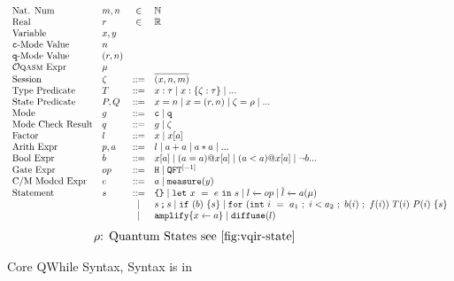 \begin{figure}[t]
{
  \small
  \[\begin{array}{llcl} 
      \text{Nat. Num} & m, n & \in & \mathbb{N}       \\
      \text{Real} & r & \in & \mathbb{R}\\
      \text{Variable} & x,y \\
      \text{\cmode-Mode Value} & n\\
      \text{\mmode-Mode Value} & (r,n)\\
      \text{\oqasm Expr} & \mu\\
      \text{Session} & \zeta & ::= & \overline{(x,n,m)} \\
      \text{Type Predicate} & T & ::= & x:\tau  \mid x:\{\zeta:\tau\} \mid ...\\
      \text{State Predicate} & P,Q & ::= & x=n\mid x=(r,n)  \mid \zeta=\rho \mid ...\\
      \text{Mode} & g & ::= & \cmode  \mid \mmode\\
      \text{Mode Check Result} & q & ::= & g  \mid \zeta\\
      \text{Factor} & l & ::= & x \mid x[a] \\
      \text{Arith Expr} & p,a & ::= & l \mid a + a \mid a * a \mid ... \\
      \text{Bool Expr} & b & ::= & x[a] \mid (a = a) @ x[a] \mid (a < a) @ x[a] \mid \neg b  ... \\
      \text{Gate Expr} & op & ::= & \texttt{H} \mid \iqft[\lbrack -1 \rbrack]{}{} \\
      \text{C/M Moded Expr}& e & ::= & a \mid \smea{y}  \\
      \text{Statement} & s & ::= & \sskip \mid \sexp{x}{e}{s} \mid  \ssassign{l}{}{op} \mid \ssassign{\overline{l}}{}{a(\mu)} 
                                 \\ & & \mid & \sseq{s}{s} \mid \sifq{b}{s} \mid
                                     \sqwhile{\sinit{i}{a_1}}{i<a_2}{b(i)}{f(i)}{T(i)}{P(i)}{s}
                     \\&&\mid & \samplify{\ssassign{x}{}{a}}
                      \mid \sdistr{l}
    \end{array}
  \]
}
{\footnotesize
\[
\begin{array}{l}
\rho \text{: Quantum States see \Cref{fig:vqir-state}}
\end{array}
\]
}
  \caption{Core QWhile Syntax, \oqasm Syntax is in }
  \label{fig:vqimp}
\end{figure}


